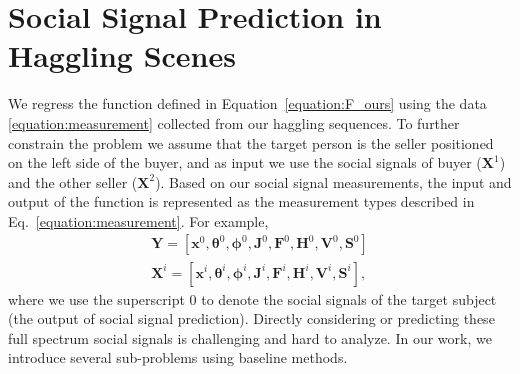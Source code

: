 
\section{Social Signal Prediction in Haggling Scenes}
We regress the function defined in Equation~\ref{equation:F_ours} using the data \ref{equation:measurement} collected from our haggling sequences. To further constrain the problem we assume that the target person is the seller positioned on the left side of the buyer, and as input we use the social signals of buyer ($\mathbf{X}^1$) and the other seller ($\mathbf{X}^2$). Based on our social signal measurements, the input and output of the function is represented as the measurement types described in Eq.~\ref{equation:measurement}. For example,
\begin{equation}
\begin{gathered}
\mathbf{Y} = [ \mathbf{x}^0, \mathbf{\theta}^0, \mathbf{\phi}^0, \mathbf{J}^0, \mathbf{F}^0, \mathbf{H}^0, \mathbf{V}^0, \mathbf{S}^0 ]\\
\mathbf{X}^i = [ \mathbf{x}^i, \mathbf{\theta}^i, \mathbf{\phi}^i, \mathbf{J}^i, \mathbf{F}^i, \mathbf{H}^i, \mathbf{V}^i, \mathbf{S}^i ],
\end{gathered}
\end{equation}
where we use the superscript 0 to denote the social signals of the target subject (the output of social signal prediction). Directly considering or predicting these full spectrum social signals is challenging and hard to analyze. In our work, we introduce several sub-problems using baseline methods. 


